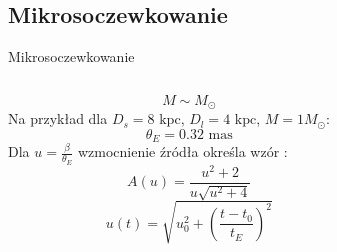 \documentclass{beamer}
\begin{document}
\subsection{Mikrosoczewkowanie}
\begin{frame}{Mikrosoczewkowanie}
    \begin{columns}
        \begin{column}{0.6\linewidth}
            \[M \sim M_{\odot}\]
            Na przykład dla $D_s = 8 \text{ kpc}$, $D_l = 4 \text{ kpc}$, $M = 1 M_{\odot}$:
            \[\theta_E = 0.32 \text{ mas}\]
            Dla $u = \frac{\beta}{\theta_E}$ wzmocnienie źródła określa wzór \cite{Schneider1992}:
            \[A(u) = \frac{u^2 + 2}{u \sqrt{u^2 + 4}}\]
            \[u(t) = \sqrt{u_0^2 + \left(\frac{t-t_0}{t_E}\right)^2}\]
        \end{column}
        \begin{column}{0.4\linewidth}
            \begin{figure}
                \centering

\end{figure}
\end{column}
\end{columns}
\end{frame}
\end{document}
